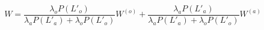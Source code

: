 \begin{equation}\label{overall_waiting_time}
    W = \frac{\lambda_o P(L'_o)}{\lambda_a P(L'_a) + \lambda_o P(L'_o)} W^{(o)} + \frac{\lambda_a P(L'_a)}{\lambda_a P(L'_a) + \lambda_o P(L'_o)} W^{(a)}
\end{equation}





